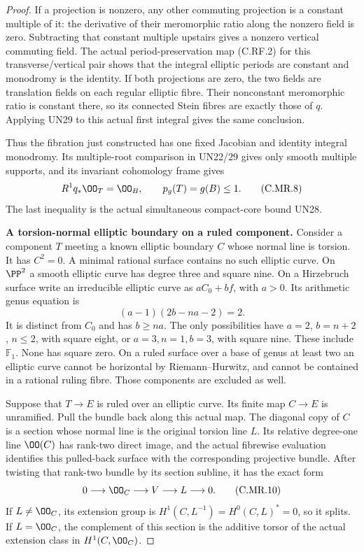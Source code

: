 \begin{proof}
If a projection is nonzero, any other commuting
projection is a constant multiple of it:
the derivative of their meromorphic ratio
along the nonzero field is zero. Subtracting
that constant multiple upstairs gives a
nonzero vertical commuting field. The
actual period-preservation map (C.RF.2)
for this transverse/vertical pair shows
that the integral elliptic periods are
constant and monodromy is the identity.
If both projections are zero, the two
fields are translation fields on each
regular elliptic fibre. Their nonconstant
meromorphic ratio is constant there,
so its connected Stein fibres are
exactly those of $q$. Applying UN29
to this actual first integral gives
the same conclusion.

Thus the fibration just constructed has
one fixed Jacobian and identity integral
monodromy. Its multiple-root comparison
in UN22/29 gives only smooth multiple
supports, and its invariant cohomology
frame gives
\[
             R^1q_*\OO_T=\OO_B,\qquad
                         p_g(T)=g(B)\le1.
\tag{C.MR.8}
\]
The last inequality is the actual simultaneous
compact-core bound UN28.

\par\medskip\noindent\textbf{A torsion-normal elliptic boundary on a ruled component.}
Consider a component $T$ meeting a known elliptic
boundary $C$ whose normal line is torsion. It has
$C^2=0$. A minimal rational surface contains no
such elliptic curve. On $\PP^2$ a smooth elliptic
curve has degree three and square nine. On a
Hirzebruch surface write an irreducible elliptic
curve as $aC_0+bf$, with $a>0$. Its arithmetic
genus equation is
\[
           (a-1)(2b-na-2)=2.
\tag{C.MR.9}
\]
It is distinct from $C_0$ and has $b\ge na$.
The only possibilities have $a=2$, $b=n+2$,
$n\le2$, with square eight, or $a=3,n=1,b=3$,
with square nine. These include $\mathbb F_1$.
None has square zero. On a ruled surface over
a base of genus at least two an elliptic curve
cannot be horizontal by Riemann--Hurwitz, and
cannot be contained in a rational ruling fibre.
Those components are excluded as well.

Suppose that $T\to E$ is ruled over an elliptic
curve. Its finite map $C\to E$ is unramified.
Pull the bundle back along this actual map.
The diagonal copy of $C$ is a section whose
normal line is the original torsion line $L$.
Its relative degree-one line $\OO(C)$ has
rank-two direct image, and the actual
fibrewise evaluation identifies this
pulled-back surface with the corresponding
projective bundle. After twisting that
rank-two bundle by its section subline,
it has the exact form
\[
     0\longrightarrow\OO_C\longrightarrow V
                         \longrightarrow L\longrightarrow0.
\tag{C.MR.10}
\]
If $L\ne\OO_C$, its extension group is
$H^1(C,L^{-1})=H^0(C,L)^*=0$, so it splits.
If $L=\OO_C$, the complement of this section
is the additive torsor of the actual extension
class in $H^1(C,\OO_C)$.


\end{proof}
